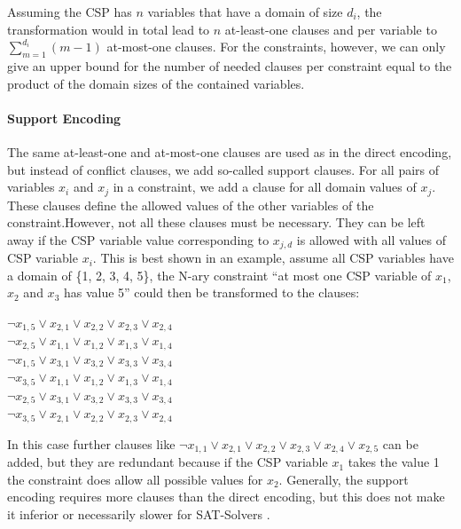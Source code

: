 Assuming the CSP has $n$ variables that have a domain of size $d_i$, the transformation would in total lead to $n$ at-least-one clauses and per variable to $\sum_{m=1}^{d_i} (m-1)$ at-most-one clauses. For the constraints, however, we can only give an upper bound for the number of needed clauses per constraint equal to the product of the domain sizes of the contained variables.

\paragraph{Support Encoding \cite{kasif1990OnTheParallelComplexityOfDiscreteRelaxationInConstraintSatisfactionNetworks}\cite{gent20002ArcConsistencyInSAT}}
The same at-least-one and at-most-one clauses are used as in the direct encoding, but instead of conflict clauses, we add so-called support clauses. For all pairs of variables $x_i$ and $x_j$ in a constraint, we add a clause for all domain values of $x_j$. These clauses define the allowed values of the other variables of the constraint.However, not all these clauses must be necessary. They can be left away if the CSP variable value corresponding to $x_{j,d}$ is allowed with all values of CSP variable $x_i$. 
This is best shown in an example, assume all CSP variables have a domain of \{1, 2, 3, 4, 5\}, the N-ary constraint ``at most one CSP variable of $x_1$, $x_2$ and $x_3$ has value 5” could then be transformed to the clauses:
\begin{center}
 $\neg x_{1,5} \lor x_{2,1} \lor x_{2,2} \lor x_{2,3} \lor x_{2,4}$\\
 $\neg x_{2,5} \lor x_{1,1} \lor x_{1,2} \lor x_{1,3} \lor x_{1,4}$\\
 $\neg x_{1,5} \lor x_{3,1} \lor x_{3,2} \lor x_{3,3} \lor x_{3,4}$\\
 $\neg x_{3,5} \lor x_{1,1} \lor x_{1,2} \lor x_{1,3} \lor x_{1,4}$\\
 $\neg x_{2,5} \lor x_{3,1} \lor x_{3,2} \lor x_{3,3} \lor x_{3,4}$\\
 $\neg x_{3,5} \lor x_{2,1} \lor x_{2,2} \lor x_{2,3} \lor x_{2,4}$\\
\end{center}
In this case further clauses like $\neg x_{1,1} \lor x_{2,1} \lor x_{2,2} \lor x_{2,3} \lor x_{2,4} \lor x_{2,5}$ can be added, but they are redundant because if the CSP variable $x_1$ takes the value 1 the constraint does allow all possible values for $x_2$. Generally, the support encoding requires more clauses than the direct encoding, but this does not make it inferior or necessarily slower for SAT-Solvers \cite{gent20002ArcConsistencyInSAT}. 


